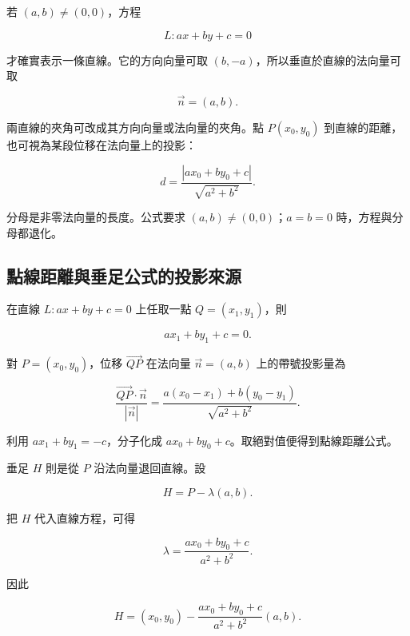 \documentclass[11pt,a4paper]{article}
\begin{document}
若 \((a,b)\ne(0,0)\)，方程

\[
L:ax+by+c=0
\]

才確實表示一條直線。它的方向向量可取 \((b,-a)\)，所以垂直於直線的法向量可取

\[
\boxed{\vec n=(a,b)}.
\]

兩直線的夾角可改成其方向向量或法向量的夾角。點 \(P(x_0,y_0)\) 到直線的距離，也可視為某段位移在法向量上的投影：

\[
\boxed{
d=\frac{|ax_0+by_0+c|}{\sqrt{a^2+b^2}}
}.
\]

分母是非零法向量的長度。公式要求 \((a,b)\ne(0,0)\)；\(a=b=0\) 時，方程與分母都退化。

\subsection{點線距離與垂足公式的投影來源}\label{ux9edeux7ddaux8dddux96e2ux8207ux5782ux8db3ux516cux5f0fux7684ux6295ux5f71ux4f86ux6e90}

在直線 \(L:ax+by+c=0\) 上任取一點 \(Q=(x_1,y_1)\)，則

\[
ax_1+by_1+c=0.
\]

對 \(P=(x_0,y_0)\)，位移 \(\overrightarrow{QP}\) 在法向量 \(\vec n=(a,b)\) 上的帶號投影量為

\[
\frac{\overrightarrow{QP}\cdot\vec n}{|\vec n|}
=\frac{a(x_0-x_1)+b(y_0-y_1)}{\sqrt{a^2+b^2}}.
\]

利用 \(ax_1+by_1=-c\)，分子化成 \(ax_0+by_0+c\)。取絕對值便得到點線距離公式。

垂足 \(H\) 則是從 \(P\) 沿法向量退回直線。設

\[
H=P-\lambda(a,b).
\]

把 \(H\) 代入直線方程，可得

\[
\lambda=\frac{ax_0+by_0+c}{a^2+b^2}.
\]

因此

\[
\boxed{
H=(x_0,y_0)
-\frac{ax_0+by_0+c}{a^2+b^2}(a,b)
}.
\]
\end{document}

